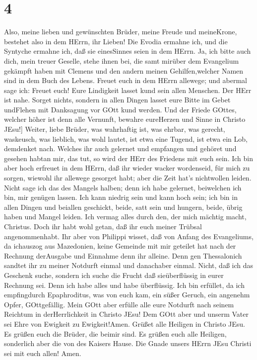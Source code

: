 \hypertarget{section-3}{%
\section{4}\label{section-3}}

 Also, meine lieben und gewünschten Brüder, meine Freude und
meineKrone, bestehet also in dem HErrn, ihr Lieben!  Die
Evodia ermahne ich, und die Syntyche ermahne ich, daß sie einesSinnes
seien in dem HErrn.  Ja, ich bitte auch dich, mein treuer
Geselle, stehe ihnen bei, die samt mirüber dem Evangelium gekämpft haben
mit Clemens und den andern meinen Gehilfen,welcher Namen sind in dem
Buch des Lebens.  Freuet euch in dem HErrn allewege; und
abermal sage ich: Freuet euch!  Eure Lindigkeit lasset kund
sein allen Menschen. Der HErr ist nahe.  Sorget nichts,
sondern in allen Dingen lasset eure Bitte im Gebet undFlehen mit
Danksagung vor GOtt kund werden.  Und der Friede GOttes,
welcher höher ist denn alle Vernunft, bewahre eureHerzen und Sinne in
Christo JEsu!{]}  Weiter, liebe Brüder, was wahrhaftig ist,
was ehrbar, was gerecht, waskeusch, was lieblich, was wohl lautet, ist
etwa eine Tugend, ist etwa ein Lob, demdenket nach.  Welches
ihr auch gelernet und empfangen und gehöret und gesehen habtan mir, das
tut, so wird der HErr des Friedens mit euch sein.  Ich bin
aber hoch erfreuet in dem HErrn, daß ihr wieder wacker wordenseid, für
mich zu sorgen, wiewohl ihr allewege gesorget habt; aber die Zeit hat's
nichtwollen leiden.  Nicht sage ich das des Mangels halben;
denn ich habe gelernet, beiwelchen ich bin, mir genügen lassen.
 Ich kann niedrig sein und kann hoch sein; ich bin in allen
Dingen und beiallen geschickt, beide, satt sein und hungern, beide,
übrig haben und Mangel leiden.  Ich vermag alles durch den,
der mich mächtig macht, Christus.  Doch ihr habt wohl
getan, daß ihr euch meiner Trübsal angenommenhabt.  Ihr
aber von Philippi wisset, daß von Anfang des Evangeliums, da ichauszog
aus Mazedonien, keine Gemeinde mit mir geteilet hat nach der Rechnung
derAusgabe und Einnahme denn ihr alleine.  Denn gen
Thessalonich sandtet ihr zu meiner Notdurft einmal und danachaber
einmal.  Nicht, daß ich das Geschenk suche, sondern ich
suche die Frucht daß sieüberflüssig in eurer Rechnung sei. 
Denn ich habe alles und habe überflüssig. Ich bin erfüllet, da ich
empfingdurch Epaphroditus, was von euch kam, ein süßer Geruch, ein
angenehm Opfer, GOttgefällig.  Mein GOtt aber erfülle alle
eure Notdurft nach seinem Reichtum in derHerrlichkeit in Christo JEsu!
 Dem GOtt aber und unserm Vater sei Ehre von Ewigkeit zu
Ewigkeit!Amen.  Grüßet alle Heiligen in Christo JEsu. Es
grüßen euch die Brüder, die beimir sind.  Es grüßen euch
alle Heiligen, sonderlich aber die von des Kaisers Hause. 
Die Gnade unsers HErrn JEsu Christi sei mit euch allen! Amen.
